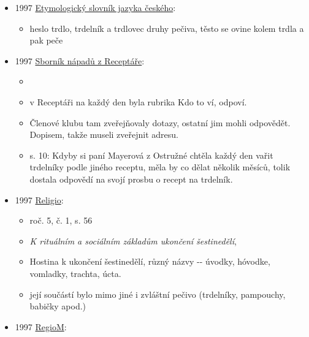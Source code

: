 \begin{itemize}
\begin{itemize}
    \begin{itemize}
    \tightlist
    \item
      citujou Šoupalovu pozůstalost, 20. léta 20. století
    \item
      v masopustě se pekly i pekou dosud koblihy, boží milost, trdelníky
      a smažené puky
    \end{itemize}
  \end{itemize}
\item
  1997
  \href{https://ceskadigitalniknihovna.cz/view/uuid:df5be160-ef7c-11e2-9923-005056827e52?page=uuid:bba8b2b0-0f12-11e3-9439-005056825209&fulltext=trdlovec&source=nkp}{Etymologický
  slovník jazyka českého}:

  \begin{itemize}
  \tightlist
  \item
    heslo trdlo, trdelník a trdlovec druhy pečiva, těsto se ovine kolem
    trdla a pak peče
  \end{itemize}
\item
  1997
  \href{https://www.digitalniknihovna.cz/mzk/uuid/uuid:490d5560-a02a-11e6-baa5-005056827e51}{Sborník
  nápadů z Receptáře}:

  \begin{itemize}
  \tightlist
  \item
  \item
    v Receptáři na každý den byla rubrika Kdo to ví, odpoví.
  \item
    Členové klubu tam zveřejňovaly dotazy, ostatní jim mohli odpovědět.
    Dopisem, takže museli zveřejnit adresu.
  \item
    s. 10: Kdyby si paní Mayerová z Ostružné chtěla každý den vařit
    trdelníky podle jiného receptu, měla by co dělat několik měsíců,
    tolik dostala odpovědí na svojí prosbu o recept na trdelník.
  \end{itemize}
\item
  1997
  \href{https://www.digitalniknihovna.cz/mzk/uuid/uuid:77d6cb30-828a-11e3-b315-001018b5eb5c}{Religio}:

  \begin{itemize}
  \tightlist
  \item
    roč. 5, č. 1, s. 56
  \item
    \emph{K rituálním a sociálním základům ukončení šestinedělí},
  \item
    Hostina k ukončení šestinedělí, různý názvy -\/- úvodky, hóvodke,
    vomladky, trachta, úcta.
  \item
    její součástí bylo mimo jiné i zvláštní pečivo (trdelníky,
    pampouchy, babičky apod.)
  \end{itemize}
\item
  1997
  \href{https://www.digitalniknihovna.cz/mzk/uuid/uuid:296c8c20-451b-11e3-ad8c-005056827e52}{RegioM}:


\end{itemize}

